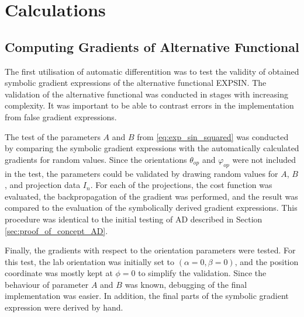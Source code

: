 
\chapter{Calculations}

\section{Computing Gradients of Alternative Functional}\label{sec:calc_alt_functional} %

The first utilisation of automatic differentition was to test the validity of obtained symbolic gradient expressions of the alternative functional EXPSIN.
The validation of the alternative functional was conducted in stages with increasing complexity.
It was important to be able to contrast errors in the implementation from false gradient expressions.


The test of the parameters $A$ and $B$ from \eqref{eq:exp_sin_squared} was conducted by comparing the symbolic gradient expressions with the automatically calculated gradients for random values.
Since the orientations $\theta_{op}$ and $\varphi_{op}$ were not included in the test, the parameters could be validated by drawing random values for $A$, $B$,
and projection data $I_{n}$.
For each of the projections, the cost function was evaluated, the backpropagation of the gradient was performed, and the result was compared to the evaluation of the symbolically derived gradient expressions.
This procedure was identical to the initial testing of AD described in Section \ref{sec:proof_of_concept_AD}.

Finally, the gradients with respect to the orientation parameters were tested.
For this test, the lab orientation was initially set to $\left( \alpha = 0, \beta = 0 \right)$, and the position coordinate was mostly kept at $\phi = 0$ to simplify the validation.
Since the behaviour of parameter $A$ and $B$ was known, debugging of the final implementation was easier. %
In addition, the final parts of the symbolic gradient expression were derived by hand.


